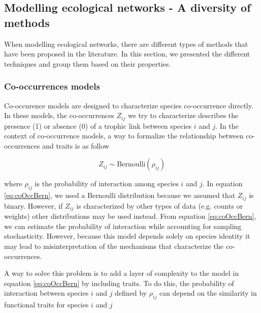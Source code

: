 \subsection*{Modelling ecological networks - A diversity of methods}
\label{models-of-species-interactions}

When modelling ecological networks, there are different types of methods that
have been proposed in the literature. In this section, we presented the
different techniques and group them based on their properties.

\subsubsection*{Co-occurrences models}
\label{Co-occurrences models}


Co-occurence models are designed to characterize species co-occurrence directly.
In these models, the co-occurrences $Z_{ij}$ we try to characterize describes
the presence (1) or absence (0) of a trophic link between species $i$ and $j$.
In the context of co-occurrence models,  a way to formalize the relationship
between co-occurrences and traits is as follow

\begin{equation}
  \label{eq:coOccBern}
  Z_{ij} \sim \text{Bernoulli}(\rho_{ij})
\end{equation}

where $\rho_{ij}$ is the probability of interaction among species $i$ and $j$.
In equation \ref{eq:coOccBern}, we used a Bernoulli distribution because we
assumed that $Z_{ij}$ is binary. However, if $Z_{ij}$ is characterized by other
types of data (e.g. counts or weights) other distributions may be used instead.
From equation \ref{eq:coOccBern}, we can estimate the probability of interaction
while accounting for sampling stochasticity. However, because this model depends
solely on species identity it may lead to misinterpretation of the mechanisms
that characterize the co-occurrences.

A way to solve this problem is to add a layer of complexity to the model in
equation \ref{eq:coOccBern} by including traits. To do this, the probability of
interaction between species $i$ and $j$ defined by $\rho_{ij}$ can depend on the
similarity in functional traits for species $i$ and $j$

